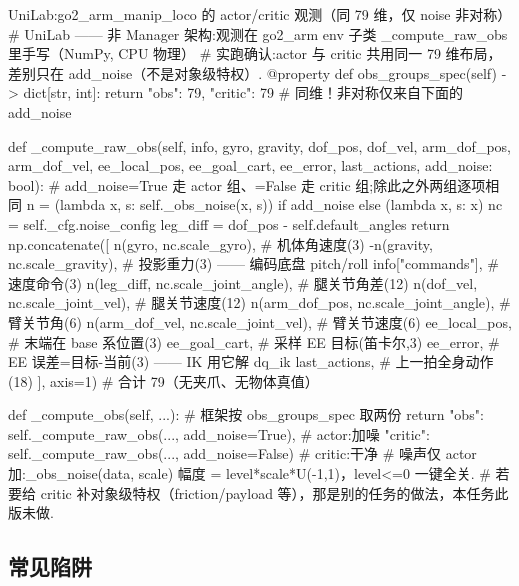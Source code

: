 \begin{codebox}[Python]{UniLab:go2\_arm\_manip\_loco 的 actor/critic 观测（同 79 维，仅 noise 非对称）}
# UniLab —— 非 Manager 架构:观测在 go2_arm env 子类 _compute_raw_obs 里手写（NumPy, CPU 物理）
# 实跑确认:actor 与 critic 共用同一 79 维布局，差别只在 add_noise（不是对象级特权）.
@property
def obs_groups_spec(self) -> dict[str, int]:
    return {"obs": 79, "critic": 79}          # 同维！非对称仅来自下面的 add_noise

def _compute_raw_obs(self, info, gyro, gravity, dof_pos, dof_vel,
                     arm_dof_pos, arm_dof_vel, ee_local_pos, ee_goal_cart,
                     ee_error, last_actions, add_noise: bool):
    # add_noise=True 走 actor 组、=False 走 critic 组;除此之外两组逐项相同
    n = (lambda x, s: self._obs_noise(x, s)) if add_noise else (lambda x, s: x)
    nc = self._cfg.noise_config
    leg_diff = dof_pos - self.default_angles
    return np.concatenate([
        n(gyro, nc.scale_gyro),                        # 机体角速度(3)
        -n(gravity, nc.scale_gravity),                 # 投影重力(3) —— 编码底盘 pitch/roll
        info["commands"],                              # 速度命令(3)
        n(leg_diff, nc.scale_joint_angle),             # 腿关节角差(12)
        n(dof_vel, nc.scale_joint_vel),                # 腿关节速度(12)
        n(arm_dof_pos, nc.scale_joint_angle),          # 臂关节角(6)
        n(arm_dof_vel, nc.scale_joint_vel),            # 臂关节速度(6)
        ee_local_pos,                                  # 末端在 base 系位置(3)
        ee_goal_cart,                                  # 采样 EE 目标(笛卡尔,3)
        ee_error,                                      # EE 误差=目标-当前(3) —— IK 用它解 dq_ik
        last_actions,                                  # 上一拍全身动作(18)
    ], axis=1)                                         # 合计 79（无夹爪、无物体真值）

def _compute_obs(self, ...):                           # 框架按 obs_groups_spec 取两份
    return {"obs":    self._compute_raw_obs(..., add_noise=True),    # actor:加噪
            "critic": self._compute_raw_obs(..., add_noise=False)}  # critic:干净
# 噪声仅 actor 加:_obs_noise(data, scale) 幅度 = level*scale*U(-1,1)，level<=0 一键全关.
# 若要给 critic 补对象级特权（friction/payload 等），那是别的任务的做法，本任务此版未做.
\end{codebox}

\subsection{常见陷阱}
\label{sec:rlmc-lm-obs-pitfalls}


